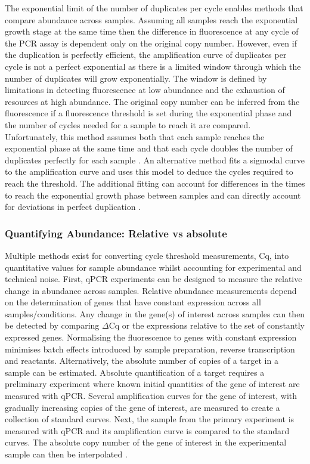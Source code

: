 \documentclass[../main.tex]{subfiles}
\begin{document}
The exponential limit of the number of duplicates per cycle enables methods that compare abundance across samples. 
Assuming all samples reach the exponential growth stage at the same time then the difference in fluorescence at any cycle of the PCR assay is dependent only on the original copy number. 
However, even if the duplication is perfectly efficient, the amplification curve of duplicates per cycle is not a perfect exponential as there is a limited window through which the number of duplicates will grow exponentially.
The window is defined by limitations in detecting fluorescence at low abundance and the exhaustion of resources at high abundance.
The original copy number can be inferred from the fluorescence if a fluorescence threshold is set during the exponential phase and the number of cycles needed for a sample to reach it are compared.
Unfortunately, this method assumes both that each sample reaches the exponential phase at the same time and that each cycle doubles the number of duplicates perfectly for each sample \parencite{VanGuilder2008}. 
An alternative method fits a sigmodal curve to the amplification curve and uses this model to deduce the cycles required to reach the threshold.
The additional fitting can account for differences in the times to reach the exponential growth phase between samples and can directly account for deviations in perfect duplication \parencite{Swillens2008}. 

\subsubsection{Quantifying Abundance: Relative vs absolute}

Multiple methods exist for converting cycle threshold measurements, Cq, into quantitative values for sample abundance whilst accounting for experimental and technical noise.
First, qPCR experiments can be designed to measure the relative change in abundance across samples.
Relative abundance measurements depend on the determination of genes that have constant expression across all samples/conditions.
Any change in the gene(s) of interest across samples can then be detected by comparing $\Delta$Cq or the expressions relative to the set of constantly expressed genes.
Normalising the fluorescence to genes with constant expression minimises batch effects introduced by sample preparation, reverse transcription and reactants.
Alternatively, the absolute number of copies of a target in a sample can be estimated.
Absolute quantification of a target requires a preliminary experiment where known initial quantities of the gene of interest are measured with qPCR.
Several amplification curves for the gene of interest, with gradually increasing copies of the gene of interest, are measured to create a collection of standard curves.
Next, the sample from the primary experiment is measured with qPCR and its amplification curve is compared to the standard curves.
The absolute copy number of the gene of interest in the experimental sample can then be interpolated \parencite{Wong2005, VanGuilder2008}.
\end{document}
